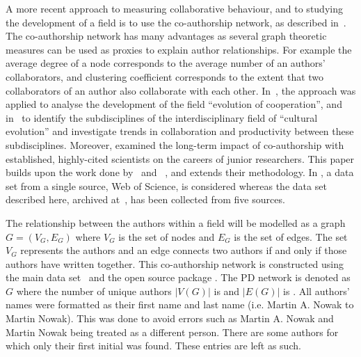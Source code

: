 A more recent approach to measuring collaborative behaviour, and to studying the
development of a field is to use the co-authorship network, as described
in~\cite{Liu2015}. The co-authorship network has many advantages as several
graph theoretic measures can be used as proxies to explain author relationships.
For example the average degree of a node corresponds to the average number of
an authors' collaborators, and clustering coefficient corresponds to the extent that
two collaborators of an author also collaborate with each other.
In~\cite{Liu2015}, the approach was applied to analyse the development of the field
``evolution of cooperation'', and in~\cite{youngblood2018} to identify the
subdisciplines of the interdisciplinary field of ``cultural evolution'' and
investigate trends in collaboration and productivity between these subdisciplines.
Moreover, \cite{Li2019} examined the
long-term impact of co-authorship with established, highly-cited scientists on
the careers of junior researchers. This paper builds upon the work done
by~\cite{Liu2015} and ~\cite{youngblood2018}, and extends their methodology.
In \cite{Liu2015, youngblood2018}, a data set from a
single source, Web of Science, is considered whereas the data set described here, archived
at~\cite{pd_data_2018}, has been collected from five sources.


The relationship between the authors within a field will be modelled as a graph
\(G = (V_G, E_G)\) where \(V_G\) is the set of nodes and \(E_G\)  is the set of
edges. The set \(V_G\) represents the authors and an edge connects two authors
if and only if those authors have written together. This co-authorship network is
constructed using the main data set~\cite{pd_data_2018} and the open source package
\cite{networkx}. The PD network is denoted as \(G\) where the
number of unique authors \(|V(G)|\) is \authors and \(|E(G)|\) is \edges.
All authors' names were formatted as their first name and last name (i.e.
Martin A. Nowak to Martin Nowak). This was done to avoid errors such as Martin
A. Nowak and Martin Nowak being treated as a different person. There are some
authors for which only their first initial was found. These entries are left as
such.

